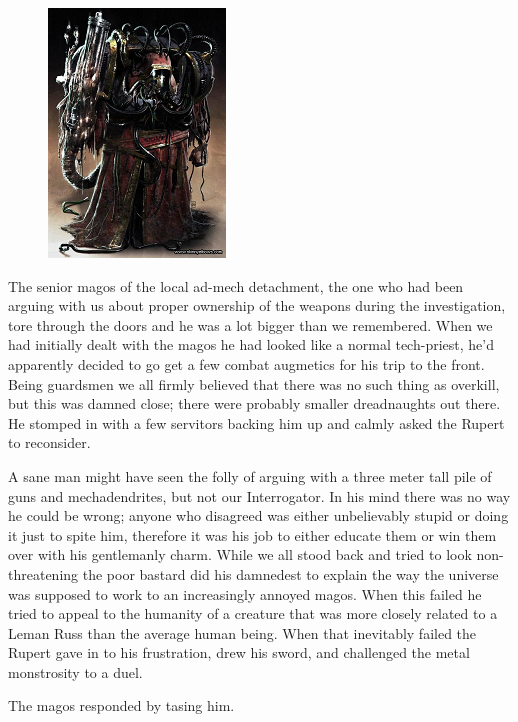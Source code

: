 \begin{figure}
	\begin{center}
		\includegraphics[width=\figwidth]{pics/4/30.png}
	\end{center}
\end{figure}
The senior magos of the local ad-mech detachment, the one who had been arguing with us about proper ownership of the weapons during the investigation, tore through the doors and he was a lot bigger than we remembered. 
When we had initially dealt with the magos he had looked like a normal tech-priest, he'd apparently decided to go get a few combat augmetics for his trip to the front. 
Being guardsmen we all firmly believed that there was no such thing as overkill, but this was damned close; 
there were probably smaller dreadnaughts out there. 
He stomped in with a few servitors backing him up and calmly asked the Rupert to reconsider.

A sane man might have seen the folly of arguing with a three meter tall pile of guns and mechadendrites, but not our Interrogator. 
In his mind there was no way he could be wrong; 
anyone who disagreed was either unbelievably stupid or doing it just to spite him, therefore it was his job to either educate them or win them over with his gentlemanly charm. 
While we all stood back and tried to look non-threatening the poor bastard did his damnedest to explain the way the universe was supposed to work to an increasingly annoyed magos. %
When this failed he tried to appeal to the humanity of a creature that was more closely related to a Leman Russ than the average human being. 
When that inevitably failed the Rupert gave in to his frustration, drew his sword, and challenged the metal monstrosity to a duel.

The magos responded by tasing him.

